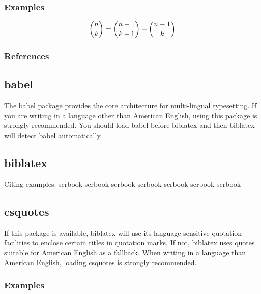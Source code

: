 \subsubsection{Examples}
$$\dbinom{n}{k} = \dbinom{n-1}{k-1} +\dbinom{n-1}{k}$$
\subsubsection{References}

\subsection{babel}
The babel package provides the core architecture for multi-lingual typesetting.
If you are writing in a language other than American English, using this package
is strongly recommended. You should load babel before biblatex and then biblatex
will detect babel automatically.

\subsection{biblatex}
Citing examples:
scrbook \autocite{KOH01}\newline
scrbook \autocite{SOR01}\newline
scrbook \autocite{GER01}\newline
scrbook \autocite{GER02}\newline
scrbook \autocite{LOS03}\newline
scrbook \autocite{BAL01}\newline
scrbook \autocite{BAL02}\newline

\subsection{csquotes}
If this package is available, biblatex will use its language sensitive quotation
facilities to enclose certain titles in quotation marks. If not, biblatex uses
quotes suitable for American English as a fallback. When writing in a language
than American English, loading csquotes is strongly recommended.

\subsubsection{Examples}
